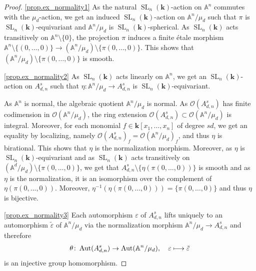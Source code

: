\documentclass[11pt]{article}
\newcommand{\skpt}{\smallskip}
\numberwithin{equation}{section}
\let\mathcal\mathscr
\def\mto{\mathchoice{\longmapsto}{\mapsto}{\mapsto}{\mapsto}}
\theoremstyle{plain}
\theoremstyle{definition}
\DeclareMathOperator{\SL}{SL}
\DeclareMathOperator{\Aut}{Aut}
\newcommand{\OO}{\mathcal{O}}
\renewcommand{\AA}{\mathbb{A}}
\newcommand{\kk}{{\boldsymbol{k}}}
\begin{document}
\skpt
\begin{proof}
\eqref{prop.ex_normality1}
As the natural $\SL_n(\kk)$-action on $\AA^n$ commutes with the $\mu_d$-action,
we get an induced $\SL_n(\kk)$-action on $\AA^n / \mu_d$ such that $\pi$ is $\SL_n(\kk)$-equivariant
and $\AA^n / \mu_d$ is $\SL_n(\kk)$-spherical. As $\SL_n(\kk)$ acts transitively
on $\AA^n \setminus \{0\}$, the projection $\pi$ induces a finite étale morphism
$\AA^n \setminus \{(0, \ldots, 0)\} \to (\AA^n / \mu_d) \setminus \{\pi(0, \ldots, 0 )\}$. This shows
that $(\AA^n / \mu_d) \setminus \{\pi(0, \ldots, 0 )\}$ is smooth.

\eqref{prop.ex_normality2}
As $\SL_n(\kk)$ acts linearly on $\AA^n$, we get an $\SL_n(\kk)$-action on
$A_{d, n}^s$ such that $\eta \colon \mathbb{A}^n/\mu_d \to A_{d, n}^s$ is $\SL_n(\kk)$-equivariant.

As $\AA^n$ is normal, the algebraic quotient $\AA^n / \mu_d$ is normal.
As $\OO(A_{d, n}^s)$ has finite codimension in $\OO(\AA^n / \mu_d)$, the ring
extension $\OO(A_{d, n}^s) \subset \OO(\AA^n / \mu_d)$
is integral. Moreover, for each
monomial $f \in \kk[x_1, \ldots, x_n]$ of degree $sd$, we get an
equality by localizing, namely $\OO(A_{d, n}^s)_f = \OO(\AA^n / \mu_d)_f$, and thus $\eta$ is birational.
This shows that $\eta$ is the normalization morphism.
Moreover, as $\eta$ is $\SL_n(\kk)$-equivariant
and as $\SL_n(\kk)$ acts transitively on $(\AA^d / \mu_d) \setminus \{\pi(0, \ldots, 0)\}$, we get
that $A_{d, n}^s \setminus \{\eta(\pi(0, \ldots, 0))\}$ is smooth and as $\eta$ is the normalization,
it is an isomorphism over the complement of $\eta(\pi(0, \ldots, 0))$.
Moreover, $\eta^{-1}(\eta(\pi(0, \ldots, 0))) = \{\pi(0, \ldots, 0)\}$ and thus $\eta$ is bijective.

\eqref{prop.ex_normality3}
Each automorphism $\varepsilon$ of $A_{d, n}^s$ lifts uniquely to an automorphism
$\tilde{\varepsilon}$ of $\AA^n / \mu_d$ via
the normalization morphism $\AA^n / \mu_d \to A_{d, n}^s$ and therefore
\[
\theta \colon \Aut(A_{d,n}^s) \to \Aut(\mathbb{A}^n/\mu_d), \quad\varepsilon \mto \tilde{\varepsilon}
\]
is an injective group homomorphism.


\end{proof}
\end{document}
